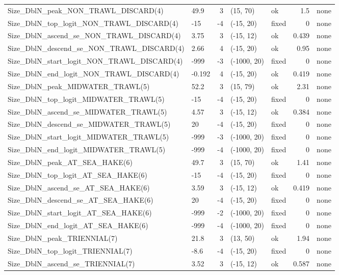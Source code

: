 \documentclass[
]{scrartcl}
\begin{document}
\begin{longtable}{llrllrl}
Size\_DblN\_peak\_NON\_TRAWL\_DISCARD(4) & 49.9 & 3 & (15, 70) & ok & 1.5 & none \\ 
Size\_DblN\_top\_logit\_NON\_TRAWL\_DISCARD(4) & -15 & -4 & (-15, 20) & fixed & 0 & none \\ 
Size\_DblN\_ascend\_se\_NON\_TRAWL\_DISCARD(4) & 3.75 & 3 & (-15, 12) & ok & 0.439 & none \\ 
Size\_DblN\_descend\_se\_NON\_TRAWL\_DISCARD(4) & 2.66 & 4 & (-15, 20) & ok & 0.95 & none \\ 
Size\_DblN\_start\_logit\_NON\_TRAWL\_DISCARD(4) & -999 & -3 & (-1000, 20) & fixed & 0 & none \\ 
Size\_DblN\_end\_logit\_NON\_TRAWL\_DISCARD(4) & -0.192 & 4 & (-15, 20) & ok & 0.419 & none \\ 
Size\_DblN\_peak\_MIDWATER\_TRAWL(5) & 52.2 & 3 & (15, 79) & ok & 2.31 & none \\ 
Size\_DblN\_top\_logit\_MIDWATER\_TRAWL(5) & -15 & -4 & (-15, 20) & fixed & 0 & none \\ 
Size\_DblN\_ascend\_se\_MIDWATER\_TRAWL(5) & 4.57 & 3 & (-15, 12) & ok & 0.384 & none \\ 
Size\_DblN\_descend\_se\_MIDWATER\_TRAWL(5) & 20 & -4 & (-15, 20) & fixed & 0 & none \\ 
Size\_DblN\_start\_logit\_MIDWATER\_TRAWL(5) & -999 & -3 & (-1000, 20) & fixed & 0 & none \\ 
Size\_DblN\_end\_logit\_MIDWATER\_TRAWL(5) & -999 & -4 & (-1000, 20) & fixed & 0 & none \\ 
Size\_DblN\_peak\_AT\_SEA\_HAKE(6) & 49.7 & 3 & (15, 70) & ok & 1.41 & none \\ 
Size\_DblN\_top\_logit\_AT\_SEA\_HAKE(6) & -15 & -4 & (-15, 20) & fixed & 0 & none \\ 
Size\_DblN\_ascend\_se\_AT\_SEA\_HAKE(6) & 3.59 & 3 & (-15, 12) & ok & 0.419 & none \\ 
Size\_DblN\_descend\_se\_AT\_SEA\_HAKE(6) & 20 & -4 & (-15, 20) & fixed & 0 & none \\ 
Size\_DblN\_start\_logit\_AT\_SEA\_HAKE(6) & -999 & -2 & (-1000, 20) & fixed & 0 & none \\ 
Size\_DblN\_end\_logit\_AT\_SEA\_HAKE(6) & -999 & -4 & (-1000, 20) & fixed & 0 & none \\ 
Size\_DblN\_peak\_TRIENNIAL(7) & 21.8 & 3 & (13, 50) & ok & 1.94 & none \\ 
Size\_DblN\_top\_logit\_TRIENNIAL(7) & -8.6 & -4 & (-15, 20) & fixed & 0 & none \\ 
Size\_DblN\_ascend\_se\_TRIENNIAL(7) & 3.52 & 3 & (-15, 12) & ok & 0.587 & none \\ 

\end{longtable}
\end{document}
